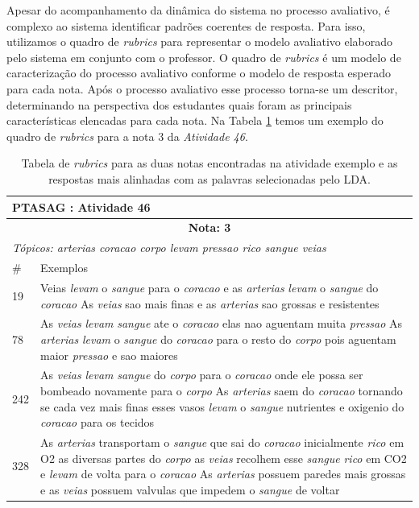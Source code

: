 Apesar do acompanhamento da dinâmica do sistema no processo avaliativo, é complexo ao sistema identificar padrões coerentes de resposta. Para isso, utilizamos o quadro de \textit{rubrics} para representar o modelo avaliativo elaborado pelo sistema em conjunto com o professor. O quadro de \textit{rubrics} é um modelo de caracterização do processo avaliativo conforme o modelo de resposta esperado para cada nota. Após o processo avaliativo esse processo torna-se um descritor, determinando na perspectiva dos estudantes quais foram as principais características elencadas para cada nota. Na Tabela \ref{tab-rubrics-exemplo} temos um exemplo do quadro de \textit{rubrics} para a nota 3 da \textit{Atividade 46}.

\begin{table}[!h]
\centering
\caption{Tabela de \textit{rubrics} para as duas notas encontradas na atividade exemplo e as respostas mais alinhadas com as palavras selecionadas pelo LDA.}
\label{tab-rubrics-exemplo}
\footnotesize
\begin{tabular}{ p{2cm} | p{14cm}}
\multicolumn{2}{l}{\textbf{PTASAG : Atividade 46}} \\ \hline
\multicolumn{2}{c}{\textbf{Nota: 3}} \\ \hline 
\multicolumn{2}{l}{\textit{T{\'o}picos: arterias coracao corpo levam pressao rico sangue veias}} \\ \hline
 \# & Exemplos \\ \hline
19 & Veias \textit{levam} o \textit{sangue} para o \textit{coracao} e as \textit{arterias} \textit{levam} o \textit{sangue} do \textit{coracao} As \textit{veias} sao mais finas e as \textit{arterias} sao grossas e resistentes\\ \hline
78 & As \textit{veias} \textit{levam} \textit{sangue} ate o \textit{coracao} elas nao aguentam muita \textit{pressao} As \textit{arterias} \textit{levam} o \textit{sangue} do \textit{coracao} para o resto do \textit{corpo} pois aguentam maior \textit{pressao} e sao maiores\\ \hline
242 & As \textit{veias} \textit{levam} \textit{sangue} do \textit{corpo} para o \textit{coracao} onde ele possa ser bombeado novamente para o \textit{corpo} As \textit{arterias} saem do \textit{coracao} tornando se cada vez mais finas esses vasos \textit{levam} o \textit{sangue} nutrientes e oxigenio do \textit{coracao} para os tecidos\\ \hline
328 & As \textit{arterias} transportam o \textit{sangue} que sai do \textit{coracao} inicialmente \textit{rico} em O2 as diversas partes do \textit{corpo} as \textit{veias} recolhem esse \textit{sangue} \textit{rico} em CO2 e \textit{levam} de volta para o \textit{coracao} As \textit{arterias} possuem paredes mais grossas e as \textit{veias} possuem valvulas que impedem o \textit{sangue} de voltar\\ \hline

\end{tabular}
\end{table}
